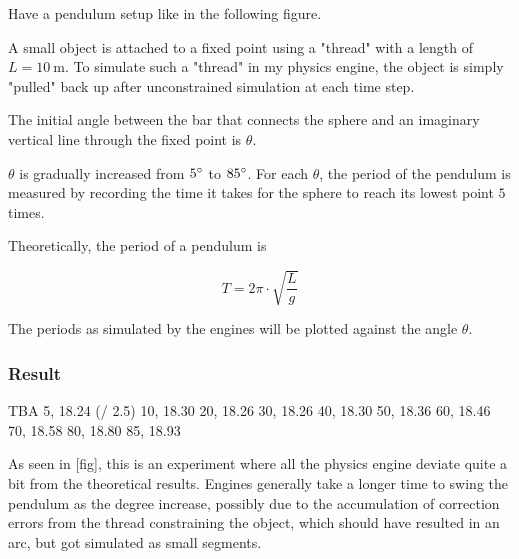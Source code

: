\documentclass[12pt,a4paper,twoside,openright]{report}
\begin{document}
Have a pendulum setup like in the following figure.

A small object is attached to a fixed point using a "thread" with a length of $L=\SI{10}{\m}$. To simulate such a "thread" in my physics engine, the object is simply "pulled" back up after unconstrained simulation at each time step.

The initial angle between the bar that connects the sphere and an imaginary vertical line through the fixed point is $\theta$.

\begin{center}
\end{center}

$\theta$ is gradually increased from $5 \degree$ to $85 \degree$.
For each $\theta$, 
the period of the pendulum is measured by recording the time it takes for the sphere to reach its lowest point $5$ times.

Theoretically, the period of a pendulum is

\begin{equation}
T = 2  \pi \cdot \sqrt{\frac{L}{g}}
\end{equation}

The periods as simulated by the engines will be plotted against the angle $\theta$.

\subsubsection{Result}

TBA
5, 18.24 (/ 2.5)
10, 18.30
20, 18.26
30, 18.26
40, 18.30
50, 18.36
60, 18.46
70, 18.58
80, 18.80
85, 18.93

As seen in [fig], this is an experiment where all the physics engine deviate quite a bit from the theoretical results. Engines generally take a longer time to swing the pendulum as the degree increase, possibly due to the accumulation of correction errors from the thread constraining the object, which should have resulted in an arc, but got simulated as small segments.
\end{document}
